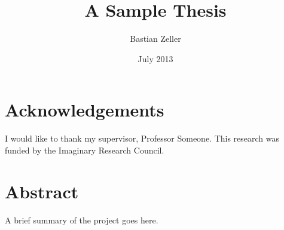 \documentclass[oneside]{scrbook}
\title{A Sample Thesis}
\author{Bastian Zeller}
\date{July 2013}
\begin{document}
 
\maketitle 

\frontmatter 
\tableofcontents 
\listoffigures 
\listoftables 

\chapter{Acknowledgements} 

I would like to thank my supervisor, Professor Someone. This 
research was funded by the Imaginary Research Council. 

\chapter{Abstract} 

A brief summary of the project goes here. 

\mainmatter 

 
 
 
 
 

\backmatter 
\end{document}
